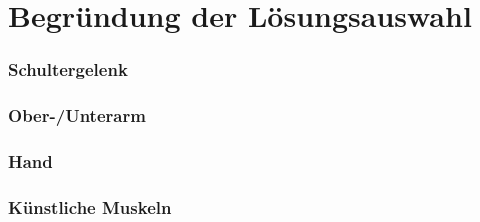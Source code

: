 \chapter{Begründung der Lösungsauswahl}\label{Begründung Lösungsauswahl}


\subsection{Schultergelenk}


\subsection{Ober-/Unterarm}


\subsection{Hand}


\subsection{Künstliche Muskeln}
	